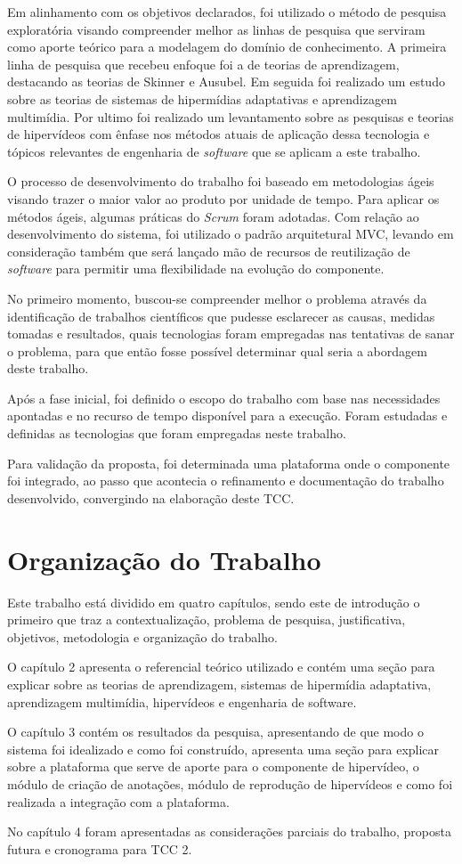 Em alinhamento com os objetivos declarados, foi utilizado o método de pesquisa exploratória visando compreender melhor as linhas de pesquisa que serviram como aporte teórico para a modelagem do domínio de conhecimento. A primeira linha de pesquisa que recebeu enfoque foi a de teorias de aprendizagem, destacando as teorias de Skinner e Ausubel. Em seguida foi realizado um estudo sobre as teorias de sistemas de hipermídias adaptativas e aprendizagem multimídia. Por ultimo foi realizado um levantamento sobre as pesquisas e teorias de hipervídeos com ênfase nos métodos atuais de aplicação dessa tecnologia e tópicos relevantes de engenharia de \textit{software} que se aplicam a este trabalho.

O processo de desenvolvimento do trabalho foi baseado em metodologias ágeis visando trazer o maior valor ao produto por unidade de tempo. Para aplicar os métodos ágeis, algumas práticas do \textit{Scrum} foram adotadas. Com relação ao desenvolvimento do sistema, foi utilizado o padrão arquitetural MVC, levando em consideração também que será lançado mão de recursos de reutilização de \textit{software} para permitir uma flexibilidade na evolução do componente.

No primeiro momento, buscou-se compreender melhor o problema através da identificação de trabalhos científicos que pudesse esclarecer as causas, medidas tomadas e resultados, quais tecnologias foram empregadas nas tentativas de sanar o problema, para que então fosse possível determinar qual seria a abordagem deste trabalho.

Após a fase inicial, foi definido o escopo do trabalho com base nas necessidades apontadas e no recurso de tempo disponível para a execução. Foram estudadas e definidas as tecnologias que foram empregadas neste trabalho.

Para validação da proposta, foi determinada uma plataforma onde o componente foi integrado, ao passo que acontecia o refinamento e documentação do trabalho desenvolvido, convergindo na elaboração deste TCC.

\section{Organização do Trabalho}

Este trabalho está dividido em quatro capítulos, sendo este de introdução o primeiro que traz a contextualização, problema de pesquisa, justificativa, objetivos, metodologia e organização do trabalho.

O capítulo 2 apresenta o referencial teórico utilizado e contém uma seção para explicar sobre as teorias de aprendizagem, sistemas de hipermídia adaptativa, aprendizagem multimídia, hipervídeos e engenharia de software.

O capítulo 3 contém os resultados da pesquisa, apresentando de que modo o sistema foi idealizado e como foi construído, apresenta uma seção para explicar sobre a plataforma que serve de aporte para o componente de hipervídeo, o módulo de criação de anotações, módulo de reprodução de hipervídeos e como foi realizada a integração com a plataforma.

No capítulo 4 foram apresentadas as considerações parciais do trabalho, proposta futura e cronograma para TCC 2.
